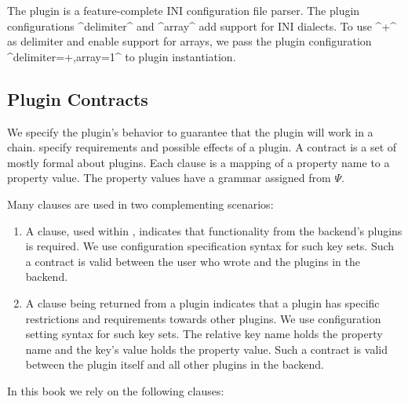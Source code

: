 \begin{example}
\label{ex:plugin-configuration}
The plugin  is a feature-complete INI configuration file parser.
The plugin configurations ^delimiter^ and ^array^ add support for INI dialects.
To use ^+^ as delimiter and enable support for arrays, we pass the plugin configuration ^delimiter=+,array=1^ to plugin instantiation.
\end{example}












\subsection{Plugin Contracts}

We specify the plugin's behavior to guarantee that the plugin will work in a chain.
 specify requirements and possible effects of a plugin.
A contract is a set of mostly formal  about plugins.
Each clause is a mapping of a property name to a property value.
The property values have a grammar assigned from $\Psi$.

Many clauses are used in two complementing scenarios:
\begin{enumerate}
\item
A clause, used within , indicates that functionality from the backend's plugins is required.
We use configuration specification syntax for such key sets.
Such a contract is valid between the user who wrote  and the plugins in the backend.
\item
A clause being returned from a plugin indicates that a plugin has specific restrictions and requirements towards other plugins.
We use configuration setting syntax for such key sets.
The relative key name holds the property name and the key's value holds the property value.
Such a contract is valid between the plugin itself and all other plugins in the backend.
\end{enumerate}

In this book we rely on the following clauses:

